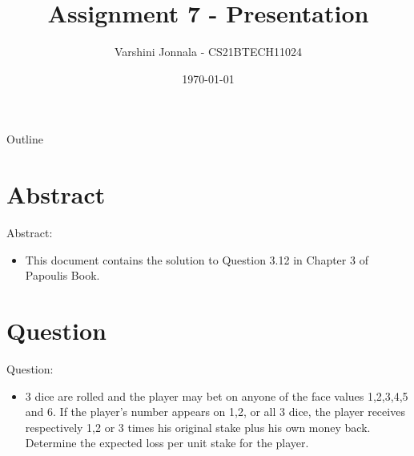 \documentclass{beamer}
\title{Assignment 7 - Presentation}
\author{Varshini Jonnala - CS21BTECH11024}
\date{\today}
\begin{document}
\begin{frame}
    \titlepage 
\end{frame}


\begin{frame}{Outline}
    \tableofcontents
\end{frame}

\section{Abstract}
\begin{frame}{Abstract}:
\begin{itemize}
    \item This document contains the solution to Question 3.12 in Chapter 3 of Papoulis Book.
\end{itemize}
\end{frame}

\section{Question}
\begin{frame}{Question}:
\begin{itemize}
    \item 3 dice are rolled and the player may bet on anyone of the face values 1,2,3,4,5 and 6. If the player's number appears on 1,2, or all 3 dice, the player receives respectively 1,2 or 3 times his original stake plus his own money back. Determine the expected loss per unit stake for the player.
\end{itemize}
\end{frame}


\end{document}
